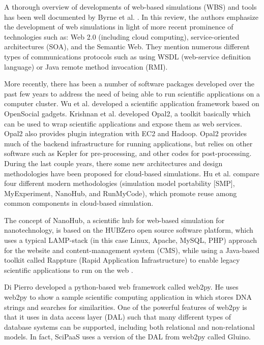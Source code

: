 \documentclass[10pt,reprint]{socc14}
\begin{document}
A thorough overview of developments of web-based simulations (WBS) and tools has been well documented by Byrne et al. \cite{byrne10}.  In this review, the authors emphasize the development of web simulations in light of more recent prominence of technologies such as: Web 2.0 (including cloud computing), service-oriented architectures (SOA), and the Semantic Web.  They mention numerous different types of communications protocols such as using WSDL (web-service definition language) or Java remote method invocation (RMI).

 More recently, there has been a number of software packages developed over the past few years to address the need of being able to run scientific applications on a computer cluster. Wu et al. \cite{wu10} developed a scientific application framework based on OpenSocial gadgets.  Krishnan et al. \cite{krishnan10} developed Opal2, a toolkit basically which can be used to wrap scientific applications and expose them as web services.   Opal2 also provides plugin integration with EC2 and Hadoop.  Opal2 provides much of the backend infrastructure for running applications, but relies on other software such as Kepler for pre-processing, and other codes for post-processing.
During the last couple years, there some new architectures and design methodologies have been proposed for cloud-based simulations.  Hu et al. \cite{hu13} compare four different modern methodologies (simulation model portability [SMP], MyExperiment, NanoHub, and RunMyCode), which promote reuse among common components in cloud-based simulation.

The concept of NanoHub, a scientific hub for web-based simulation for nanotechnology, is based on the HUBZero open source software platform, which uses a typical LAMP-stack (in this case Linux, Apache, MySQL, PHP) approach for the website and content-management system (CMS), while using a Java-based toolkit called Rappture (Rapid Application Infrastructure) to enable legacy scientific applications to run on the web \cite{mclennan10}.

Di Pierro \cite{dipierro11} developed a python-based web framework called web2py.  He uses web2py to show a sample scientific computing application in which stores DNA strings and searches for similarities.  One of the powerful features of web2py is that it uses in data access layer (DAL) such that many different types of database systems can be supported, including both relational and non-relational models.  In fact, SciPaaS uses a version of the DAL from web2py called Gluino.
\end{document}

